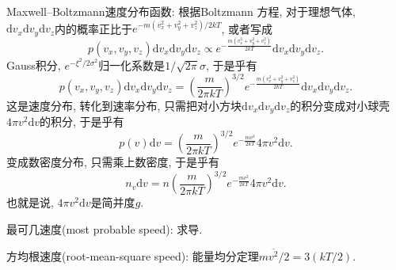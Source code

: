 Maxwell--Boltzmann速度分布函数: 根据Boltzmann 方程, 对于理想气体, $\mathrm{d}v_x\mathrm{d}v_y\mathrm{d}v_z$内的概率正比于$e^{-m(v_x^2+v_y^2+v_z^2)/2kT}$, 或者写成
\begin{equation*}
    p(v_x,v_y,v_z) \mathrm{d}v_x\mathrm{d}v_y\mathrm{d}v_z \propto e^{-\frac{m(v_x^2+v_y^2+v_z^2)}{2kT}} \mathrm{d}v_x\mathrm{d}v_y\mathrm{d}v_z.
\end{equation*}
Gauss积分, $e^{-\xi^2/2\sigma^2}$归一化系数是$1/\sqrt{2\pi}\sigma$, 于是乎有
\begin{equation*}
    p(v_x,v_y,v_z) \mathrm{d}v_x\mathrm{d}v_y\mathrm{d}v_z = \left(\frac{m}{2\pi kT}\right)^{3/2} e^{-\frac{m(v_x^2+v_y^2+v_z^2)}{2kT}} \mathrm{d}v_x\mathrm{d}v_y\mathrm{d}v_z.
\end{equation*}
这是速度分布, 转化到速率分布, 只需把对小方块$\mathrm{d}v_x\mathrm{d}v_y\mathrm{d}v_z$的积分变成对小球壳$4\pi v^2\mathrm{d}v$的积分, 于是乎有
\begin{equation*}
    p(v) \mathrm{d}v = \left(\frac{m}{2\pi kT}\right)^{3/2} e^{-\frac{mv^2}{2kT}} 4\pi v^2\mathrm{d}v.
\end{equation*}
变成数密度分布, 只需乘上数密度, 于是乎有
\begin{equation*}
    n_v \mathrm{d}v = n \left(\frac{m}{2\pi kT}\right)^{3/2} e^{-\frac{mv^2}{2kT}} 4\pi v^2\mathrm{d}v.
\end{equation*}
也就是说, $4\pi v^2\mathrm{d}v$是简并度$g$.

最可几速度(most probable speed): 求导.

方均根速度(root-mean-square speed): 能量均分定理$m\overline{v^2} /2=3(kT/2)$. 

